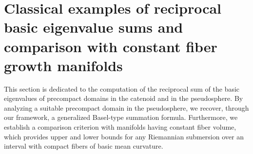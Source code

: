 \documentclass{amsart}
\theoremstyle{definition}
\theoremstyle{remark}
\numberwithin{equation}{section}
\begin{document}
\section{Classical examples of reciprocal basic eigenvalue sums and comparison with constant fiber growth manifolds} \label{Seccomparison}

This section is dedicated to the computation of the reciprocal sum of the basic eigenvalues of precompact domains in the catenoid and in the pseudosphere. By analyzing a suitable precompact domain in the pseudosphere, we recover, through our framework, a generalized Basel-type summation formula. Furthermore, we establish a comparison criterion with manifolds having constant fiber volume, which provides upper and lower bounds for any Riemannian submersion over an interval with compact fibers of basic mean curvature.
\end{document}
